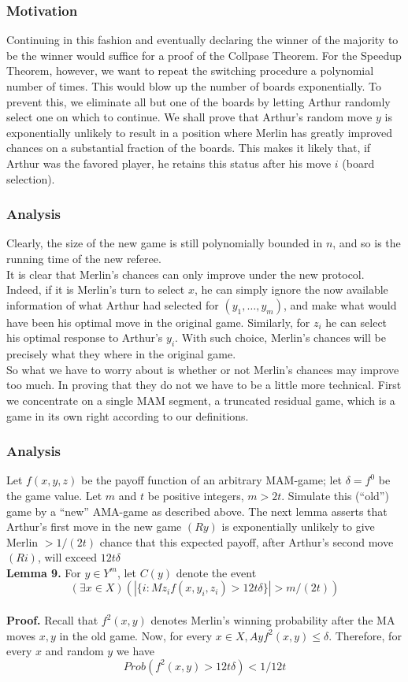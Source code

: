 \documentclass{beamer}
\begin{document}
\begin{frame}
\frametitle{Motivation}
Continuing in this fashion and eventually declaring the winner of the majority to be the winner would suffice for a proof of the Collpase Theorem. For the Speedup Theorem, however, we want to repeat the switching procedure a polynomial number of times. This would blow up the number of boards exponentially. To prevent this, we eliminate all but one of the boards by letting Arthur randomly select one on which to continue. We shall prove that Arthur's random move $y$ is exponentially unlikely to result in a position where Merlin has greatly improved chances on a substantial fraction of the boards. This makes it likely that, if Arthur was the favored player, he retains this status after his move $i$ (board selection).
\end{frame}

\begin{frame}
\frametitle{Analysis}
Clearly, the size of the new game is still polynomially bounded in $n$, and so is the running time of the new referee.\\
It is clear that Merlin's chances can only improve under the new protocol. Indeed, if it is Merlin's turn to select $x$, he can simply  ignore the now available information of what Arthur had selected for $(y_1,\dots,y_m)$, and make what would have been his optimal move in the original game. Similarly, for $z_i$ he can select his optimal response to Arthur's $y_i$. With such choice, Merlin's chances will be precisely what they where in the original game.\\
So what we have to worry about is whether or not Merlin's chances may improve too much. In proving that they do not we have to be a little more technical. First we concentrate on a single MAM segment, a truncated residual game, which is a game in its own right according to our definitions.
\end{frame}

\begin{frame}
\frametitle{Analysis}
Let $f(x, y, z)$ be the payoff function of an arbitrary MAM-game; let $\delta = f^0$ be the game value. Let $m$ and $t$ be positive integers, $m > 2t$. Simulate this (``old'') game by a ``new'' AMA-game as described above. The next lemma asserts that Arthur's first move in the new game $(Ry)$ is exponentially unlikely to give Merlin $> 1/(2t)$ chance that this expected payoff, after Arthur's second move $(Ri)$, will exceed $12t\delta$\\
\textbf{Lemma 9.} For $y \in Y^m$, let $C(y)$ denote the event
$$(\exists x \in X)(|\{i : Mz_i f(x, y_i, z_i) > 12t\delta \}| > m/(2t))$$\\
\textbf{Proof.} Recall that $f^2(x,y)$ denotes Merlin's winning probability after the MA moves $x, y$ in the old game. Now, for every $x\in X, Ayf^2(x, y) \leq \delta$. Therefore, for every $x$ and random $y$ we have
$$Prob(f^2(x,y)>12t\delta) < 1/12t$$
\end{frame}
\end{document}
